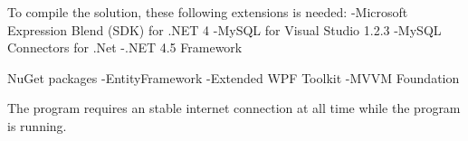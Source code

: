 To compile the solution, these following extensions is needed:
-Microsoft Expression Blend (SDK) for .NET 4
-MySQL for Visual Studio 1.2.3
-MySQL Connectors for .Net
-.NET 4.5 Framework

NuGet packages
-EntityFramework
-Extended WPF Toolkit
-MVVM Foundation

The program requires an stable internet connection at all time while the program is running.